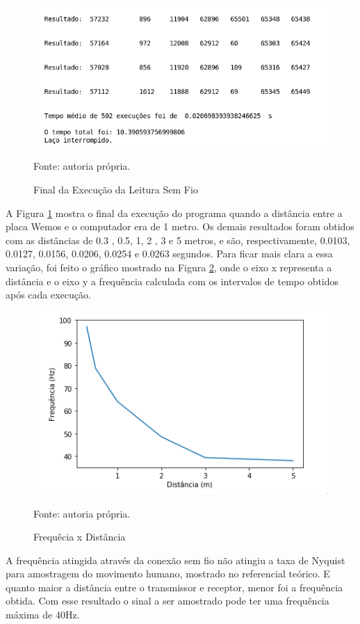 		\begin{figure}[h]
		\centering
		\includegraphics[keepaspectratio=true,scale=0.6]{figuras/execute_html.png}
		\caption{Final da Execução da Leitura  Sem Fio}
		\footnotesize Fonte: autoria própria. 
		\label{exechtml}	
	\end{figure}
	
	
	A Figura \ref{exechtml} mostra o final da execução do programa quando a distância entre a placa Wemos e o computador era de 1 metro.  Os demais resultados  foram obtidos com as distâncias de 0.3 , 0.5, 1, 2 , 3 e 5 metros,  e são, respectivamente,   0.0103, 0.0127, 0.0156, 0.0206, 0.0254 e 0.0263 segundos. Para ficar mais clara a essa variação, foi feito o gráfico mostrado na Figura \ref{grafico}, onde o eixo x representa a distância e o eixo y a frequência calculada com os intervalos de  tempo obtidos após cada execução.
	
	\begin{figure}[h]
		\centering
		\includegraphics[keepaspectratio=true,scale=0.6]{figuras/frequenciaXdist.png}
		\caption{Frequêcia x Distância}
		\footnotesize Fonte: autoria própria. 
		\label{grafico}	
	\end{figure}
	
	A frequência atingida através da conexão sem fio não atingiu a taxa de Nyquist para amostragem do movimento humano, mostrado no referencial teórico. E quanto maior a distância entre o transmissor e receptor, menor foi a frequência obtida. Com esse resultado o sinal a ser amostrado pode ter uma frequência máxima de 40Hz.
	
